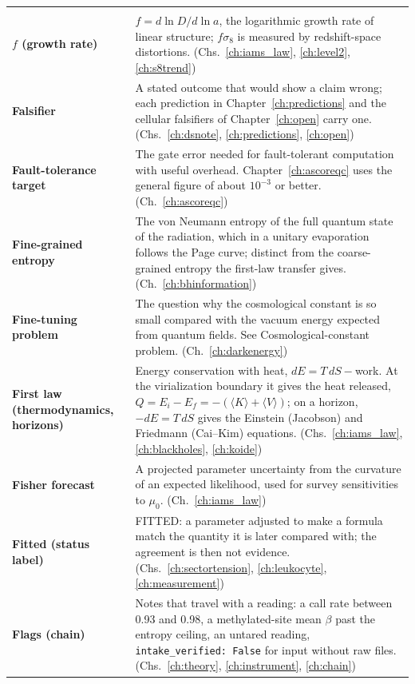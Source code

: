 {\begin{longtable}{@{}>{\raggedright\arraybackslash}p{}>{\raggedright\arraybackslash}p{}@{}}
\multicolumn{2}{@{}l}{\normalsize\textbf{F}}\\[2pt]
\textbf{$f$ (growth rate)} & $f=d\ln D/d\ln a$, the logarithmic growth rate of linear structure; $f\sigma_8$ is measured by redshift-space distortions. {\footnotesize(Chs.~\ref{ch:iams_law}, \ref{ch:level2}, \ref{ch:s8trend})}\\[1pt]
\textbf{Falsifier} & A stated outcome that would show a claim wrong; each prediction in Chapter~\ref{ch:predictions} and the cellular falsifiers of Chapter~\ref{ch:open} carry one. {\footnotesize(Chs.~\ref{ch:dsnote}, \ref{ch:predictions}, \ref{ch:open})}\\[1pt]
\textbf{Fault-tolerance target} & The gate error needed for fault-tolerant computation with useful overhead. Chapter~\ref{ch:ascoreqc} uses the general figure of about $10^{-3}$ or better. {\footnotesize(Ch.~\ref{ch:ascoreqc})}\\[1pt]
\textbf{Fine-grained entropy} & The von Neumann entropy of the full quantum state of the radiation, which in a unitary evaporation follows the Page curve; distinct from the coarse-grained entropy the first-law transfer gives. {\footnotesize(Ch.~\ref{ch:bhinformation})}\\[1pt]
\textbf{Fine-tuning problem} & The question why the cosmological constant is so small compared with the vacuum energy expected from quantum fields. See Cosmological-constant problem. {\footnotesize(Ch.~\ref{ch:darkenergy})}\\[1pt]
\textbf{First law (thermodynamics, horizons)} & Energy conservation with heat, $dE=T\,dS-$work. At the virialization boundary it gives the heat released, $Q=E_i-E_f=-(\langle K\rangle+\langle V\rangle)$; on a horizon, $-dE=T\,dS$ gives the Einstein (Jacobson) and Friedmann (Cai--Kim) equations. {\footnotesize(Chs.~\ref{ch:iams_law}, \ref{ch:blackholes}, \ref{ch:koide})}\\[1pt]
\textbf{Fisher forecast} & A projected parameter uncertainty from the curvature of an expected likelihood, used for survey sensitivities to $\mu_0$. {\footnotesize(Ch.~\ref{ch:iams_law})}\\[1pt]
\textbf{Fitted (status label)} & FITTED: a parameter adjusted to make a formula match the quantity it is later compared with; the agreement is then not evidence. {\footnotesize(Chs.~\ref{ch:sectortension}, \ref{ch:leukocyte}, \ref{ch:measurement})}\\[1pt]
\textbf{Flags (chain)} & Notes that travel with a reading: a call rate between 0.93 and 0.98, a methylated-site mean $\beta$ past the entropy ceiling, an untared reading, \texttt{intake\_verified: False} for input without raw files. {\footnotesize(Chs.~\ref{ch:theory}, \ref{ch:instrument}, \ref{ch:chain})}\\[1pt]

\end{longtable}}
